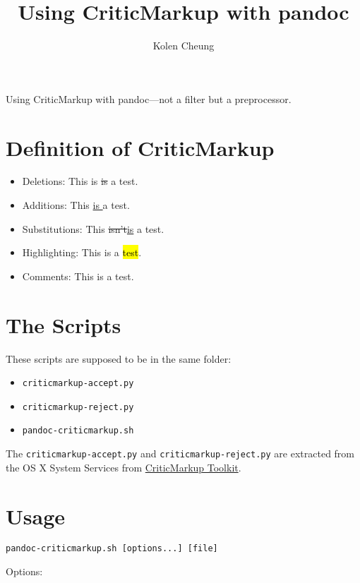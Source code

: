 \documentclass[]{article}
\title{Using CriticMarkup with pandoc}
\author{Kolen Cheung}
\date{}
\providecommand{\tightlist}{%
  \setlength{\itemsep}{0pt}\setlength{\parskip}{0pt}}
\begin{document}
\maketitle

Using CriticMarkup with pandoc---not a filter but a preprocessor.

\section{Definition of CriticMarkup}\label{definition-of-criticmarkup}

\begin{itemize}
\tightlist
\item
  Deletions: This is \st{is }a test.
\item
  Additions: This \underline{is }a test.
\item
  Substitutions: This \st{isn't}\underline{is} a test.
\item
  Highlighting: This is a \hl{test}.
\item
  Comments: This is a test.
\end{itemize}

\section{The Scripts}\label{the-scripts}

These scripts are supposed to be in the same folder:

\begin{itemize}
\tightlist
\item
  \texttt{criticmarkup-accept.py}
\item
  \texttt{criticmarkup-reject.py}
\item
  \texttt{pandoc-criticmarkup.sh}
\end{itemize}

The \texttt{criticmarkup-accept.py} and \texttt{criticmarkup-reject.py}
are extracted from the OS X System Services from
\href{http://criticmarkup.com/services.php}{CriticMarkup Toolkit}.

\section{Usage}\label{usage}

\texttt{pandoc-criticmarkup.sh\ {[}options...{]}\ {[}file{]}}

Options:
\end{document}
